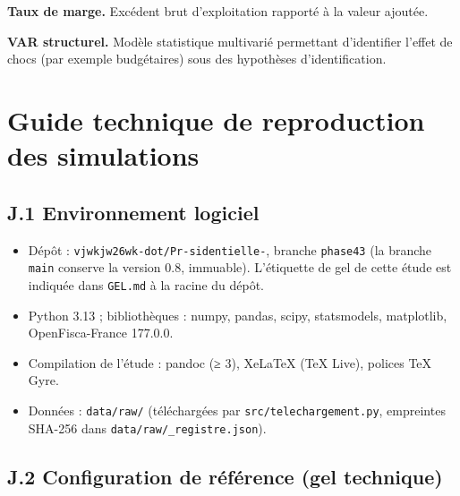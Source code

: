 \documentclass[
  11pt,
  11pt,
  a4paper,
  openany]{book}
\providecommand{\tightlist}{%
  \setlength{\itemsep}{0pt}\setlength{\parskip}{0pt}}
\begin{document}
\textbf{Taux de marge.} Excédent brut d'exploitation rapporté à la
valeur ajoutée.

\textbf{VAR structurel.} Modèle statistique multivarié permettant
d'identifier l'effet de chocs (par exemple budgétaires) sous des
hypothèses d'identification.

\hypertarget{sec:annexe-j}{%
\chapter{Guide technique de reproduction des
simulations}\label{sec:annexe-j}}

\hypertarget{j.1-environnement-logiciel}{%
\section{J.1 Environnement logiciel}\label{j.1-environnement-logiciel}}

\begin{itemize}
\tightlist
\item
  Dépôt : \texttt{vjwkjw26wk-dot/Pr-sidentielle-}, branche
  \texttt{phase43} (la branche \texttt{main} conserve la version 0.8,
  immuable). L'étiquette de gel de cette étude est indiquée dans
  \texttt{GEL.md} à la racine du dépôt.
\item
  Python 3.13 ; bibliothèques : numpy, pandas, scipy, statsmodels,
  matplotlib, OpenFisca-France 177.0.0.
\item
  Compilation de l'étude : pandoc (≥ 3), XeLaTeX (TeX Live), polices TeX
  Gyre.
\item
  Données : \texttt{data/raw/} (téléchargées par
  \texttt{src/telechargement.py}, empreintes SHA-256 dans
  \texttt{data/raw/\_registre.json}).
\end{itemize}

\hypertarget{sec:gel}{%
\section{J.2 Configuration de référence (gel technique)}\label{sec:gel}}
\end{document}
